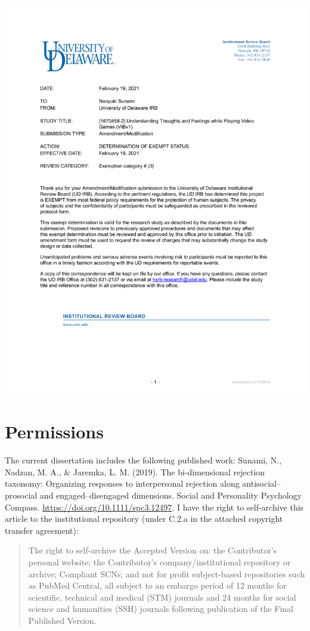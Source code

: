 \documentclass[
]{udthesis}
\begin{document}
\includegraphics[width=1\linewidth]{pdf/IRB_letter2}

\chapter{Permissions}\label{permissions}

The current dissertation includes the following published work: Sunami, N., Nadzan, M. A., \&
Jaremka, L. M. (2019). The bi‐dimensional rejection taxonomy: Organizing
responses to interpersonal rejection along antisocial--prosocial and
engaged--disengaged dimensions. Social and Personality Psychology
Compass. \url{https://doi.org/10.1111/spc3.12497}. I have the right to self-archive this article to the institutional repository (under C.2.a in the attached copyright transfer agreement):

\begin{quote}
The right to self-archive the Accepted Version on: the Contributor's personal website; the Contributor's company/institutional repository or archive; Compliant SCNs; and not for profit subject-based repositories such as PubMed Central, all subject to an embargo period of 12 months for scientific, technical and medical (STM) journals and 24 months for social science and humanities (SSH) journals following publication of the Final Published Version.
\end{quote}


\end{document}
